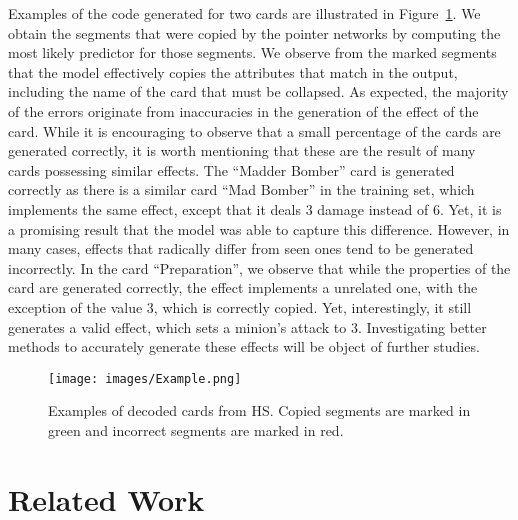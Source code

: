 \documentclass[11pt]{article}
\begin{document}
Examples of the code generated for two cards are illustrated in Figure~\ref{exp_img}. We obtain the segments that were copied by the pointer networks by computing the most likely predictor for those segments. We observe from the marked segments that the model effectively copies the attributes that match in the output, including the name of the card that must be collapsed. As expected, the majority of the errors originate from inaccuracies in the generation of the effect of the card. While it is encouraging to observe that a small percentage of the cards are generated correctly, it is worth mentioning that these are the result
of many cards possessing similar effects. The ``Madder Bomber'' card is generated correctly as there is a similar card ``Mad Bomber'' in the training set, which implements the same effect, except that it deals 3 damage instead of 6. Yet, it is a promising
result that the model was able to capture this difference. However, in many cases, effects that radically differ from seen ones tend to be generated incorrectly. In the card ``Preparation'', we observe that while the properties of the card are generated correctly, the effect implements a unrelated one, with the exception of the value 3, which is correctly copied. Yet, interestingly, it still generates a valid effect, which sets a minion's attack to 3. Investigating better methods to accurately generate these effects will be object of further studies.





\begin{figure}[ht]
\begin{center}
\centerline{\texttt{[image: images/Example.png]}}
\caption{Examples of decoded cards from HS. Copied segments are marked in green and incorrect segments are marked in red.}
\label{exp_img}
\end{center}
\end{figure}

\section{Related Work}
\label{sec:rel}
\end{document}

